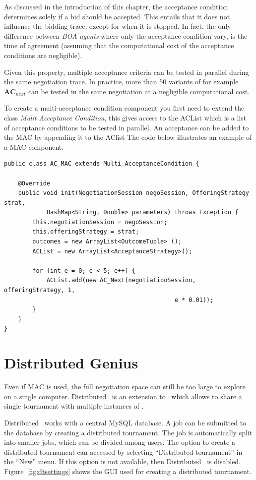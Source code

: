 \documentclass[]{article}
\begin{document}
As discussed in the introduction of this chapter, the acceptance condition determines solely if a bid should be accepted. This entails that it does not influence the bidding trace, except for when it is stopped. In fact, the only difference between \textit{BOA agents} where only the acceptance condition vary, is the time of agreement (assuming that the computational cost of the acceptance conditions are negligible).

Given this property, multiple acceptance criteria can be tested in parallel during the same negotiation trace. In practice, more than 50 variants of for example $\textbf{AC}_{next}$ can be tested in the same negotiation at a negligible computational cost.

To create a multi-acceptance condition component you first need to extend the class \textit{Mulit Acceptance Condition}, this gives access to the ACList which is a list of acceptance conditions to be tested in parallel. An acceptance can be added to the MAC by appending it to the AClist The code below illustrates an example of a MAC component.

\begin{lstlisting}
public class AC_MAC extends Multi_AcceptanceCondition {

	@Override
	public void init(NegotiationSession negoSession, OfferingStrategy strat, 
			HashMap<String, Double> parameters) throws Exception {
		this.negotiationSession = negoSession;
		this.offeringStrategy = strat;
		outcomes = new ArrayList<OutcomeTuple> ();
		ACList = new ArrayList<AcceptanceStrategy>();
		
		for (int e = 0; e < 5; e++) {
			ACList.add(new AC_Next(negotiationSession, offeringStrategy, 1, 
												e * 0.01));
		}
	}
}

\end{lstlisting}



\section{Distributed Genius}
Even if MAC is used, the full negotiation space can still be too large to explore on a single computer. Distributed \Genius ~is an extension to \Genius ~which allows to share a single tournament with multiple instances of \Genius.

Distributed \Genius ~works with a central MySQL database. A job can be submitted to the database by creating a distributed tournament. The job is automatically split into smaller jobs, which can be divided among users. The option to create a distributed tournament can accessed by selecting ``Distributed tournament'' in the ``New'' menu. If this option is not available, then Distributed \Genius ~is disabled. Figure~\ref{fig:dtsettings} shows the GUI used for creating a distributed tournament.
\end{document}
